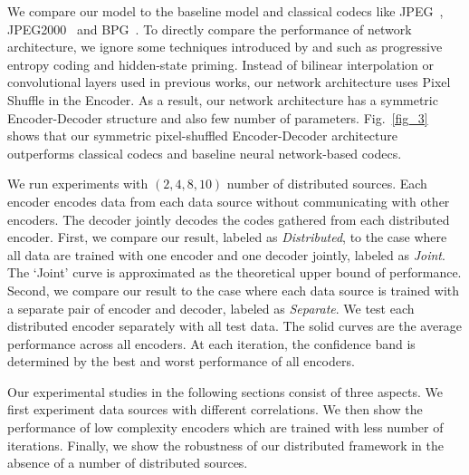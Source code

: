 \documentclass[10pt,twocolumn,letterpaper]{article}
\begin{document}
We compare our model to the baseline model \cite{toderici2017full} and classical codecs like JPEG~\cite{wallace1992jpeg}, JPEG2000~\cite{skodras2001jpeg} and BPG~\cite{bellard2014bpg}. To directly compare the performance of network architecture, we ignore some techniques introduced by \cite{toderici2017full} and \cite{johnston2017improved} such as progressive entropy coding and hidden-state priming. Instead of bilinear interpolation or convolutional layers used in previous works\cite{toderici2017full,theis2017lossy,johnston2017improved}, our network architecture uses Pixel Shuffle in the Encoder. As a result, our network architecture has a symmetric Encoder-Decoder structure and also few number of parameters. Fig.~\ref{fig_3} shows that our symmetric pixel-shuffled Encoder-Decoder architecture outperforms classical codecs and baseline neural network-based codecs.

We run experiments with $(2,4,8,10)$ number of distributed sources. Each encoder encodes data from each data source without communicating with other encoders. The decoder jointly decodes the codes gathered from each distributed encoder. First, we compare our result, labeled as \textit{Distributed}, to the case where all data are trained with one encoder and one decoder jointly, labeled as \textit{Joint}. The `Joint' curve is approximated as the theoretical upper bound of performance. %
Second, we compare our result to the case where each data source is trained with a separate pair of encoder and decoder, labeled as \textit{Separate}. We test each distributed encoder separately with all test data. The solid curves are the average performance across all encoders. At each iteration, the confidence band is determined by the best and worst performance of all encoders. 

Our experimental studies in the following sections consist of three aspects. We first experiment data sources with different correlations. We then show the performance of low complexity encoders which are trained with less number of iterations. Finally, we show the robustness of our distributed framework in the absence of a number of distributed sources.
\end{document}
